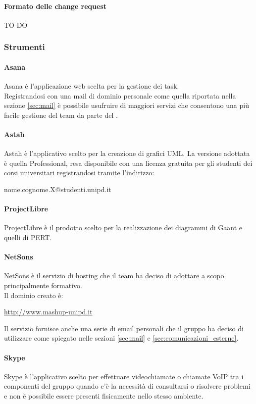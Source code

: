			\paragraph{Formato delle change request}
			TO DO	
	
		\subsubsection{Strumenti}
			\paragraph{Asana} \label{sec:Asana}
			Asana è l'applicazione web scelta per la gestione dei task.\\
			Registrandosi con una mail di dominio personale come quella riportata nella sezione \ref{sec:mail} è possibile usufruire di maggiori servizi che consentono una più facile gestione del team da parte del \roleProjectManager.
			\paragraph{Astah}
			Astah è l'applicativo scelto per la creazione di grafici UML.
			La versione adottata è quella Professional, resa disponibile con una licenza gratuita per gli studenti dei corsi universitari registrandosi tramite l'indirizzo:
				\begin{center}
					nome.cognome.X@studenti.unipd.it
				\end{center}

			\paragraph{ProjectLibre}
			ProjectLibre è il prodotto scelto per la realizzazione dei diagrammi di Gaant e quelli di PERT.
			\paragraph{NetSons}
			NetSons è il servizio di hosting che il team ha deciso di adottare a scopo principalmente formativo. \\
			Il dominio creato è:
				\begin{center}
					\url{http://www.mashup-unipd.it}
				\end{center}
			Il servizio fornisce anche una serie di email personali che il gruppo ha deciso di utilizzare come spiegato nelle sezioni \ref{sec:mail} e \ref{sec:comunicazioni_esterne}.
			\paragraph{Skype}
			Skype è l'applicativo scelto per effettuare videochiamate o chiamate VoIP tra i componenti del gruppo quando c'è la necessità di consultarsi o risolvere problemi e non è possibile essere presenti fisicamente nello stesso ambiente.		
